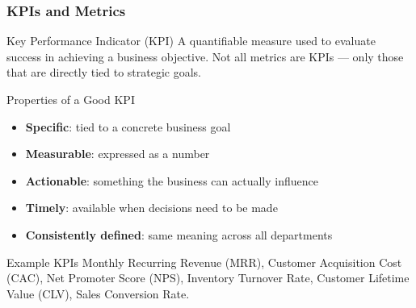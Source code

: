 \begin{frame}
  \frametitle{KPIs and Metrics}

  \begin{block}{Key Performance Indicator (KPI)}
    A quantifiable measure used to evaluate success in achieving
    a business objective. Not all metrics are KPIs --- only those
    that are directly tied to strategic goals.
  \end{block}

  \begin{block}{Properties of a Good KPI}
    \begin{itemize}
      \item \textbf{Specific}: tied to a concrete business goal
      \item \textbf{Measurable}: expressed as a number
      \item \textbf{Actionable}: something the business can actually influence
      \item \textbf{Timely}: available when decisions need to be made
      \item \textbf{Consistently defined}: same meaning across all departments
    \end{itemize}
  \end{block}

  \begin{examples}{Example KPIs}
    Monthly Recurring Revenue (MRR), Customer Acquisition Cost (CAC),
    Net Promoter Score (NPS), Inventory Turnover Rate,
    Customer Lifetime Value (CLV), Sales Conversion Rate.
  \end{examples}
\end{frame}

